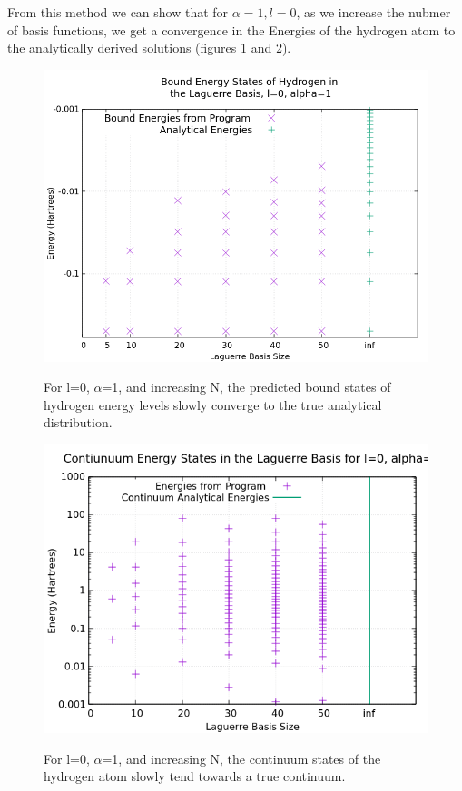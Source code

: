 \documentclass{article}
\begin{document}
	From this method we can show that for $\alpha=1, l=0$, as we increase the nubmer of basis functions, we get a convergence in the Energies of the hydrogen atom to the analytically derived solutions (figures \ref{variedNbound} and \ref{variedNcont}).
	
	\begin{figure}[H]
		\centering
		\includegraphics[scale=0.62]{Images/variedN.png}\\
		\caption{For l=0, $\alpha$=1, and increasing N, the predicted bound states of hydrogen energy levels slowly converge to the true analytical distribution.}
		\label{variedNbound}
	\end{figure}
	\begin{figure}[H]
		\centering
		\includegraphics[scale=0.7]{Images/variedNcont.png}\\
		\caption{For l=0, $\alpha$=1, and increasing N, the continuum states of the hydrogen atom slowly tend towards a true continuum.}
		\label{variedNcont}
	\end{figure}
	
\end{document}
